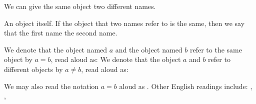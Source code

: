 

We can give the
same object two different
names.


An object
 itself.
If the object that two
names refer to is
the same,
then we say
that the first name
the second name.


We denote that
the object named $a$ and
the object named $b$ refer
to the same object
by $a = b$,
read aloud as:
We denote that
the object $a$ and
$b$ refer to different
objects by $a \neq b$,
read aloud as:

We may also read the notation
$a = b$ aloud as .
Other English readings
include: ,
,
